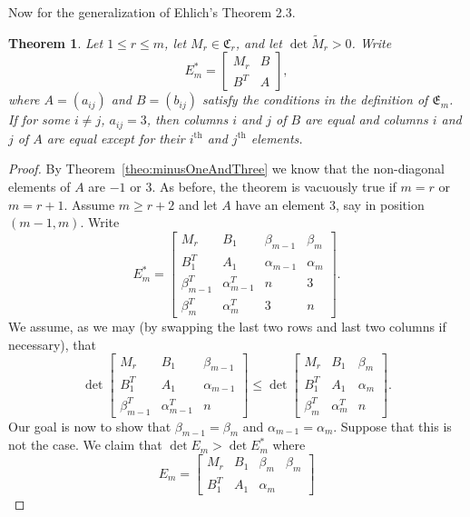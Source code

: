 \documentclass[11pt,a4paper]{article}
\newtheorem{theorem}{Theorem}
\begin{document}
Now for the generalization of Ehlich's Theorem 2.3.
\begin{theorem}\label{theo:duplCols}
Let $1\le r\le m$, let $M_r\in\mathfrak{C}_r$, and let $\det\tilde M_r>0$.  Write
\begin{equation*}
E_m^*=\begin{bmatrix}M_r & B\\B^T & A\end{bmatrix},
\end{equation*}
where $A=(a_{ij})$ and $B=(b_{ij})$ satisfy the conditions in the definition
of $\mathfrak{E}_m$.  If for some $i\ne j$, $a_{ij}=3$, then columns $i$ and
$j$ of $B$ are equal and columns $i$ and $j$ of $A$ are equal except for
their $i^\text{th}$ and $j^\text{th}$ elements.
\end{theorem}
\begin{proof}
By Theorem~\ref{theo:minusOneAndThree} we know that the non-diagonal
elements of $A$ are $-1$ or $3$.  As before, the theorem is vacuously true
if $m=r$ or $m=r+1$.  Assume $m\ge r+2$ and let $A$ have an element 3, say
in position $(m-1,m)$.  Write
\begin{equation*}
E_m^*=\begin{bmatrix}M_r & B_1 & \beta_{m-1} & \beta_m\\ B_1^T & A_1 &
\alpha_{m-1} & \alpha_m\\ \beta_{m-1}^T & \alpha_{m-1}^T & n & 3\\\beta_m^T
& \alpha_m^T & 3 & n\end{bmatrix}.
\end{equation*}
We assume, as we may (by swapping the last two rows and last two columns if
necessary), that
\begin{equation*}
\det\begin{bmatrix}M_r & B_1 & \beta_{m-1}\\ B_1^T & A_1 & \alpha_{m-1}\\ \beta_{m-1}^T & \alpha_{m-1}^T & n\end{bmatrix}\le\det\begin{bmatrix}M_r & B_1 & \beta_m\\ B_1^T & A_1 & \alpha_m\\ \beta_m^T & \alpha_m^T & n\end{bmatrix}.
\end{equation*}
Our goal is now to show that $\beta_{m-1}=\beta_m$ and
$\alpha_{m-1}=\alpha_m$. Suppose that this is not the case.  We claim that
$\det E_m>\det E_m^*$ where
\begin{equation*}
E_m=\begin{bmatrix}M_r & B_1 & \beta_m & \beta_m\\ B_1^T & A_1 & \alpha_m &

\end{bmatrix}
\end{equation*}
\end{proof}
\end{document}
